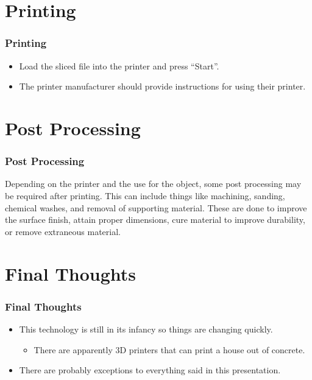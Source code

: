 \documentclass[english,10pt]{beamer}
\begin{document}
\section{Printing}
\begin{frame}
  \frametitle{Printing}
  \begin{itemize}
    \item Load the sliced file into the printer and press ``Start''.
    \item The printer manufacturer should provide instructions for using their printer.
  \end{itemize}
\end{frame}

\section{Post Processing}
\begin{frame}
  \frametitle{Post Processing}
  Depending on the printer and the use for the object, some post processing may be required after printing.  This can include things like machining, sanding, chemical washes, and removal of supporting material.  These are done to improve the surface finish, attain proper dimensions, cure material to improve durability, or remove extraneous material.
\end{frame}

\section{Final Thoughts}
\begin{frame}
  \frametitle{Final Thoughts}
  \begin{itemize}
    \item This technology is still in its infancy so things are changing quickly.
    \begin{itemize}
      \item There are apparently 3D printers that can print a house out of concrete.
    \end{itemize}
    \item There are probably exceptions to everything said in this presentation.
  \end{itemize}
\end{frame}
\end{document}

